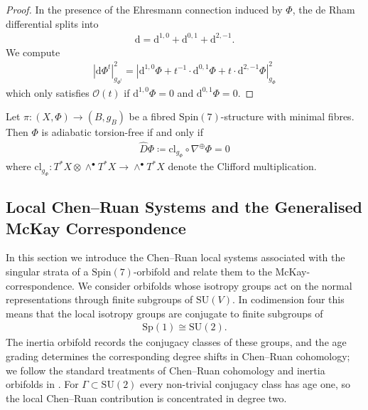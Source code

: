 \documentclass[psamsfonts]{amsart}
\theoremstyle{plain}
\theoremstyle{definition}{
\newtheorem{defi}{Definition}[section]
\newtheorem{ass}{Assumption}
\newtheorem*{nota}{Notation}}
\theoremstyle{remark}{
\newtheorem{rem}{Remark}
\newtheorem{ex}{Example}}
\theoremstyle{plain}{
\newtheorem{thm}{Theorem}[section]
\newtheorem{lem}{Lemma}[section]
\newtheorem{cor}{Corollary}[section]
\newtheorem{prop}{Proposition}[section]
\newtheorem{con}{Conjecture}[section]}
\newcommand{\m}[1]{{\mathrm{#1}}}
\begin{document}
\begin{proof}
    In the presence of the Ehresmann connection induced by $\Phi$, the de Rham differential splits into 
    \begin{align*}
        \m{d}=\m{d}^{1,0}+\m{d}^{0,1}+\m{d}^{2,-1}.
    \end{align*}
    We compute 
    \begin{align*}
        \left|\m{d}\Phi^t\right|_{g_{\Phi^t}}^2=\left|\m{d}^{1,0}\Phi+t^{-1}\cdot\m{d}^{0,1}\Phi+t\cdot\m{d}^{2,-1}\Phi\right|_{g_{\Phi}}^2
    \end{align*}
which only satisfies $\mathcal{O}(t)$ if $\m{d}^{1,0}\Phi=0$ and $\m{d}^{0,1}\Phi=0$.
\end{proof}

\begin{lem}\cite[Eq. (2.3)]{goette2014adiabatic}
    Let $\pi\colon (X,\Phi)\rightarrow (B,g_B)$ be a fibred $\m{Spin}(7)$-structure with minimal fibres. Then $\Phi$ is adiabatic torsion-free if and only if 
    \begin{align*}
        \widehat{D}\Phi\coloneqq\m{cl}_{g_{\Phi}}\circ \nabla^{\oplus}\Phi=0
    \end{align*}
    where $\m{cl}_{g_\Phi}\colon T^*X\otimes \wedge^\bullet T^*X\rightarrow \wedge^\bullet T^*X $ denote the Clifford multiplication.
\end{lem}



\subsection{Local Chen--Ruan Systems and the Generalised McKay Correspondence}
\label{Local Chen--Ruan-Systems and the Generalised McKay-Correspondence}

In this section we introduce the Chen--Ruan local systems associated with the singular strata of a $\m{Spin}(7)$-orbifold and relate them to the McKay-correspondence. We consider orbifolds whose isotropy groups act on the normal representations through finite subgroups of $\m{SU}(V)$. In codimension four this means that the local isotropy groups are conjugate to finite subgroups of
\begin{align*}
    \m{Sp}(1)\cong \m{SU}(2).
\end{align*}
The inertia orbifold records the conjugacy classes of these groups, and the age grading determines the corresponding degree shifts in Chen--Ruan cohomology; we follow the standard treatments of Chen--Ruan cohomology and inertia orbifolds in \cite{chen2004new,adem2007orbifolds,moerdijk2002orbifolds}.
For $\Gamma\subset \m{SU}(2)$ every non-trivial conjugacy class has age one, so the local Chen--Ruan contribution is concentrated in degree two.\\
\end{document}
